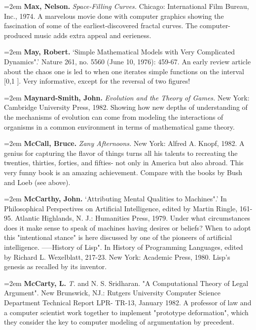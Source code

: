 \par\noindent\hangindent=2em {\bf Max, Nelson.} {\it Space-Filling Curves.} Chicago: International Film Bureau, Inc., 1974. A marvelous movie done with computer graphics showing the fascination of some of the earliest-discovered fractal curves. The computer-produced music adds extra appeal and eerieness.

\par\noindent\hangindent=2em {\bf May, Robert.} `Simple Mathematical Models with Very Complicated Dynamics".' Nature 261, no. 5560 (June 10, 1976): 459-67. An early review article about the chaos one is led to when one iterates simple functions on the interval [0,1 ]. Very informative, except for the reversal of two figures!

\par\noindent\hangindent=2em {\bf Maynard-Smith, John.} {\it Evolution and the Theory of Games.} New York: Cambridge University Press, 1982. Showing how new depths of understanding of the mechanisms of evolution can come from modeling the interactions of organisms in a common environment in terms of mathematical game theory.

\par\noindent\hangindent=2em {\bf McCall, Bruce.} {\it Zany Afternoons.} New York: Alfred A. Knopf, 1982. A genius for capturing the flavor of things turns all his talents to recreating the twenties, thirties, forties, and fifties- not only in America but also abroad. This very funny book is an amazing achievement. Compare with the books by Bush and Loeb (see above).

\par\noindent\hangindent=2em {\bf McCarthy, John.} `Attributing Mental Qualities to Machines".' In Philosophical Perspectives on Artificial Intelligence, edited by Martin Ringle, 161-95. Atlantic Highlands, N. J.: Humanities Press, 1979. Under what circumstances does it make sense to speak of machines having desires or beliefs? When to adopt this "intentional stance" is here discussed by one of the pioneers of artificial intelligence. -----History of Lisp". In History of Programming Languages, edited by Richard L. Wexelblatt, 217-23. New York: Academic Press, 1980. Lisp's genesis as recalled by its inventor.

\par\noindent\hangindent=2em {\bf McCarty, L.} {\it T.} and N. S. Sridharan. "A Computational Theory of Legal Argument". New Brunswick, NJ.: Rutgers University Computer Science Department Technical Report LPR- TR-13, January 1982. A professor of law and a computer scientist work together to implement "prototype deformation", which they consider the key to computer modeling of argumentation by precedent.

